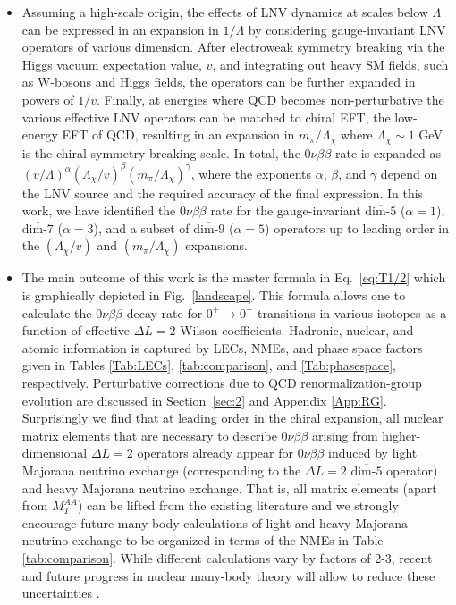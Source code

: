 \documentclass[letterpaper,11pt]{article}
\newcommand{\textoverline}[1]{$\overline{\mbox{#1}}$}
\begin{document}
\begin{itemize}
\item Assuming a high-scale origin, the effects of LNV dynamics
 at scales below $\Lambda$ can be expressed in an expansion in $1/\Lambda$ by considering gauge-invariant LNV operators of various dimension. After electroweak symmetry breaking via the Higgs vacuum expectation value, $v$, and integrating out heavy SM fields, such as W-bosons and Higgs fields,  the operators can be further expanded in  powers of $1/v$. Finally, at energies where QCD becomes non-perturbative the various effective LNV operators can be matched to chiral EFT, the low-energy EFT of QCD, resulting in an expansion in $m_\pi/\Lambda_\chi$ where $\Lambda_\chi \sim 1$ GeV is the chiral-symmetry-breaking scale. In total, the $0\nu\beta\beta$ rate is expanded as $(v/\Lambda)^\alpha (\Lambda_\chi/v)^\beta(m_\pi/\Lambda_\chi)^\gamma$, where the exponents $\alpha$, $\beta$, and $\gamma$ depend on the LNV source and the required accuracy of the final expression. In this work, we have identified the $0\nu\beta\beta$ rate for the gauge-invariant \textoverline{dim-5} ($\alpha=1$), \textoverline{dim-7} ($\alpha=3$), and a subset of \textoverline{dim-9} ($\alpha=5$) operators up to leading order in the $(\Lambda_\chi/v)$ and $(m_\pi/\Lambda_\chi)$ expansions.
 
 \item The main outcome of this work is the master formula in Eq.~\eqref{eq:T1/2} which is graphically depicted in Fig.~\ref{landscape}. This formula allows one to calculate the  $0\nu\beta\beta$ decay rate for $0^+ \rightarrow 0^+$ transitions in various  isotopes as a function of effective $\Delta L=2$ Wilson coefficients. Hadronic, nuclear, and atomic information is captured by LECs, NMEs, and phase space factors given in Tables \ref{Tab:LECs}, \ref{tab:comparison}, and \ref{Tab:phasespace}, respectively. Perturbative corrections due to QCD renormalization-group evolution are discussed in Section~\ref{sec:2} and Appendix \ref{App:RG}. Surprisingly we find that at leading order in the chiral expansion, all nuclear matrix elements that are necessary to describe $0\nu\beta\beta$ arising from higher-dimensional $\Delta L=2$ operators already appear for $0\nu\beta\beta$ induced by light Majorana neutrino exchange (corresponding to the $\Delta L=2$ \textoverline{dim-5} operator) and heavy Majorana neutrino exchange. That is, all matrix elements (apart from $M_T^{AA}$) can be lifted from the existing literature
and we strongly encourage future many-body calculations of light and heavy Majorana neutrino exchange to be organized in terms of the NMEs in Table \ref{tab:comparison}.   
While different calculations vary by factors of 2-3,   
 recent and future progress in nuclear many-body theory will  allow to reduce these uncertainties 
\cite{Barea:2015kwa,Hyvarinen:2015bda,Barea,Menendez:2017fdf,Horoi:2017gmj,Jiao:2017opc,Iwata:2016cxn,Vaquero:2014dna,Yao:2014uta,Holt:2013tda,Simkovic:2013qiy,Fang:2018tui,Wang:2018htk,Engel:2016xgb}.


\end{itemize}
\end{document}

